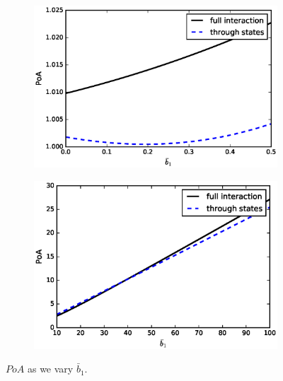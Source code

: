 \documentclass[11pt]{article}
\begin{document}
\begin{figure}[!htb]
	\centering
	\begin{subfigure}{.45\textwidth}
		\includegraphics[scale=0.5]{PoA_final_b1bar_0.eps}
	\end{subfigure}
	\begin{subfigure}{.45\textwidth}
		\includegraphics[scale=0.5]{PoA_final_b1bar_large.eps}
	\end{subfigure}
	\caption{$PoA$ as we vary $\bar{b}_1$.}
	\label{fig:b1bar}
\end{figure}
\end{document}
